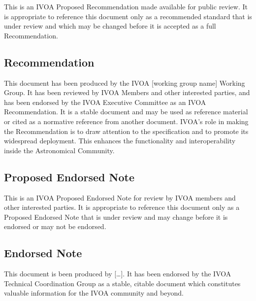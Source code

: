 \documentclass[11pt,a4paper]{ivoa}
\begin{document}
This is an IVOA Proposed Recommendation made available for public
review. It is appropriate to reference this document only as a
recommended standard that is under review and which may be changed
before it is accepted as a full Recommendation.

\subsection{Recommendation}

This document has been produced by the IVOA [working group name] Working
Group.  It has been reviewed by IVOA Members and other interested
parties, and has been endorsed by the IVOA Executive Committee as an
IVOA Recommendation. It is a stable document and may be used as
reference material or cited as a normative reference from another
document. IVOA's role in making the Recommendation is to draw attention
to the specification and to promote its widespread deployment. This
enhances the functionality and interoperability inside the Astronomical
Community.

\subsection{Proposed Endorsed Note}

This is an IVOA Proposed Endorsed Note for review by IVOA members and
other interested parties. It is appropriate to reference this document
only as a Proposed Endorsed Note that is under review and may change
before it is endorsed or may not be endorsed.

\subsection{Endorsed Note}

This document is been produced by […]. It has been endorsed by the IVOA
Technical Coordination Group as a stable, citable document which
constitutes valuable information for the IVOA community and beyond.


\end{document}

